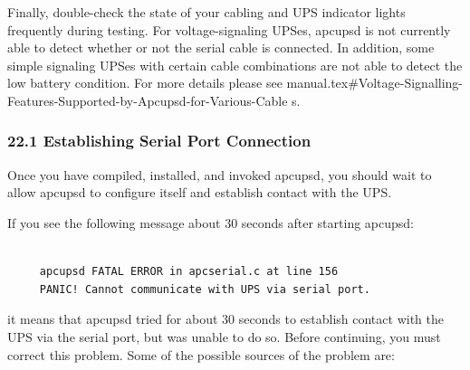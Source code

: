 {{{{{{{{{{Finally, double-check the state of your cabling and UPS indicator lights
frequently during testing.  For voltage-signaling UPSes, apcupsd is not
currently able to detect whether or not the serial cable is connected. In
addition, some simple signaling UPSes with certain cable combinations are not
able to detect the low battery condition.  For more details please see 
{manual.tex#Voltage-Signalling-Features-Supported-by-Apcupsd-for-Various-Cable%
s}. 

\label{Establishing-Serial-Port-Connection}

\subsubsection*{22.1 Establishing Serial Port Connection}

\label{index-Testing_002c-Serial-221}
Once you have compiled, installed, and invoked apcupsd, you should wait to
allow apcupsd to configure itself and establish contact with the UPS.  

If you see the following message about 30 seconds after starting apcupsd: 

\footnotesize
\begin{verbatim}
     
     apcupsd FATAL ERROR in apcserial.c at line 156
     PANIC! Cannot communicate with UPS via serial port.
\end{verbatim}
\normalsize

it means that apcupsd tried for about 30 seconds to establish contact with the
UPS via the serial port, but was unable to do so. Before continuing, you must
correct this problem. Some of the possible sources of the problem are:  

}}}}}}}}}}
